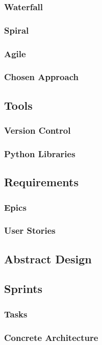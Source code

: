 \documentclass{article}
\begin{document}
\subsubsection{Waterfall}
\subsubsection{Spiral}
\subsubsection{Agile}
\subsubsection{Chosen Approach}

\subsection{Tools}
\subsubsection{Version Control}
\subsubsection{Python Libraries}


\subsection{Requirements}
\subsubsection{Epics}
\subsubsection{User Stories}

\subsection{Abstract Design}

\subsection{Sprints}
\subsubsection{Tasks}
\subsubsection{Concrete Architecture}
\end{document}
